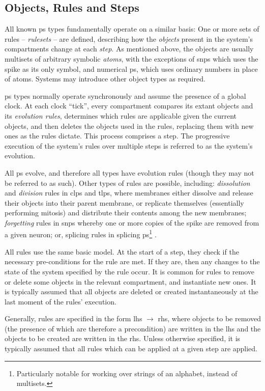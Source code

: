 \subsection{Objects, Rules and Steps}
All known \gls{ps} types fundamentally operate on a similar basis:  One or more sets of rules -- \emph{\glspl{ruleset}} -- are defined, describing how the \emph{objects} present in the system's \glspl{compartment} change at each \emph{step}.  As mentioned above, the objects are usually multisets of arbitrary symbolic \emph{atoms}, with the exceptions of \gls{snps} which uses the spike as its only symbol, and numerical \gls{ps}, which uses ordinary numbers in place of atoms.  Systems may introduce other object types as required.

\Gls{ps} types normally operate synchronously and assume the presence of a global clock.  At each clock ``tick'', every \gls{compartment} compares its extant objects and its \emph{evolution rules}, determines which rules are applicable given the current objects, and then deletes the objects used in the rules, replacing them with new ones as the rules dictate.  This process comprises a step.  The progressive execution of the system's rules over multiple steps is referred to as the system's evolution.

All \gls{ps} evolve, and therefore all types have evolution rules (though they may not be referred to as such).  Other types of rules are possible, including: \emph{dissolution} and \emph{division} rules in \gls{clps} and \gls{tlps}, where membranes either dissolve and release their objects into their parent membrane, or replicate themselves (essentially performing mitosis) and distribute their contents among the new membranes; \emph{forgetting} rules in \gls{snps} whereby one or more copies of the spike are removed from a given neuron; or, splicing rules in splicing \Gls{ps}\footnote{Particularly notable for working over strings of an alphabet, instead of multisets.} \cite[Ch.~8]{Paun2010b}.

All rules use the same basic model.  At the start of a step, they check if the necessary pre-conditions for the rule are met.  If they are, then any changes to the state of the system specified by the rule occur.  It is common for rules to remove or delete some objects in the relevant \gls{compartment}, and instantiate new ones.  It is typically assumed that all objects are deleted or created instantaneously at the last moment of the rules' execution.

Generally, rules are specified in the form \textsf{\gls{lhs}} \(\rightarrow\) \textsf{\gls{rhs}}, where objects to be removed (the presence of which are therefore a precondition) are written in the \gls{lhs} and the objects to be created are written in the \gls{rhs}.  Unless otherwise specified, it is typically assumed that all rules which can be applied at a given step are applied.

